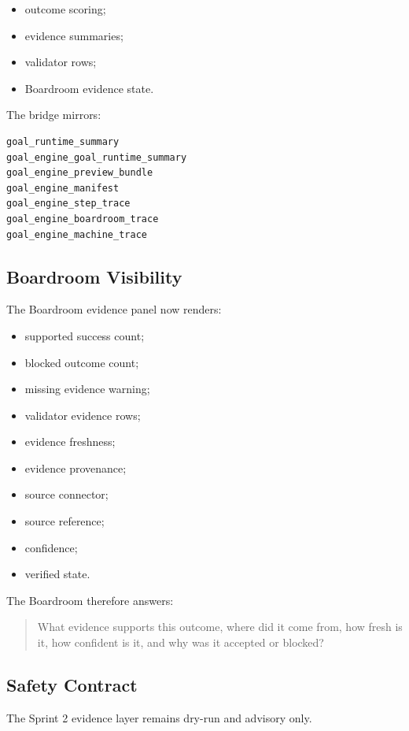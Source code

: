 \begin{itemize}
  \item outcome scoring;
  \item evidence summaries;
  \item validator rows;
  \item Boardroom evidence state.
\end{itemize}

The bridge mirrors:

\begin{verbatim}
goal_runtime_summary
goal_engine_goal_runtime_summary
goal_engine_preview_bundle
goal_engine_manifest
goal_engine_step_trace
goal_engine_boardroom_trace
goal_engine_machine_trace
\end{verbatim}

\subsection{Boardroom Visibility}

The Boardroom evidence panel now renders:

\begin{itemize}
  \item supported success count;
  \item blocked outcome count;
  \item missing evidence warning;
  \item validator evidence rows;
  \item evidence freshness;
  \item evidence provenance;
  \item source connector;
  \item source reference;
  \item confidence;
  \item verified state.
\end{itemize}

The Boardroom therefore answers:

\begin{quote}
What evidence supports this outcome, where did it come from, how fresh is it, how confident is it, and why was it accepted or blocked?
\end{quote}

\subsection{Safety Contract}

The Sprint 2 evidence layer remains dry-run and advisory only.

